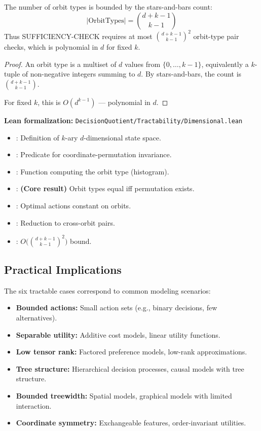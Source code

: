 \begin{theorem}\label{thm:symmetric-complexity}
The number of orbit types is bounded by the stars-and-bars count:
\[
|\text{OrbitTypes}| = \binom{d + k - 1}{k - 1}
\]
Thus SUFFICIENCY-CHECK requires at most $\binom{d + k - 1}{k - 1}^2$ orbit-type pair checks, which is polynomial in $d$ for fixed $k$.
\end{theorem}

\begin{proof}
An orbit type is a multiset of $d$ values from $\{0, \ldots, k-1\}$, equivalently a $k$-tuple of non-negative integers summing to $d$. By stars-and-bars, the count is $\binom{d + k - 1}{k - 1}$.

For fixed $k$, this is $O(d^{k-1})$ --- polynomial in $d$.
\end{proof}

\noindent\textbf{Lean formalization:} \texttt{DecisionQuotient/Tractability/Dimensional.lean}
\begin{itemize}
\item {}: Definition of $k$-ary $d$-dimensional state space.
\item {}: Predicate for coordinate-permutation invariance.
\item {}: Function computing the orbit type (histogram).
\item {}: \textbf{(Core result)} Orbit types equal iff permutation exists.
\item {}: Optimal actions constant on orbits.
\item {}: Reduction to cross-orbit pairs.
\item {}: $O\bigl(\binom{d+k-1}{k-1}^2\bigr)$ bound.
\end{itemize}

\subsection{Practical Implications}\label{sec:tract-practical}

The six tractable cases correspond to common modeling scenarios:

\begin{itemize}
\item \textbf{Bounded actions:} Small action sets (e.g., binary decisions, few alternatives).
\item \textbf{Separable utility:} Additive cost models, linear utility functions.
\item \textbf{Low tensor rank:} Factored preference models, low-rank approximations.
\item \textbf{Tree structure:} Hierarchical decision processes, causal models with tree structure.
\item \textbf{Bounded treewidth:} Spatial models, graphical models with limited interaction.
\item \textbf{Coordinate symmetry:} Exchangeable features, order-invariant utilities.
\end{itemize}

